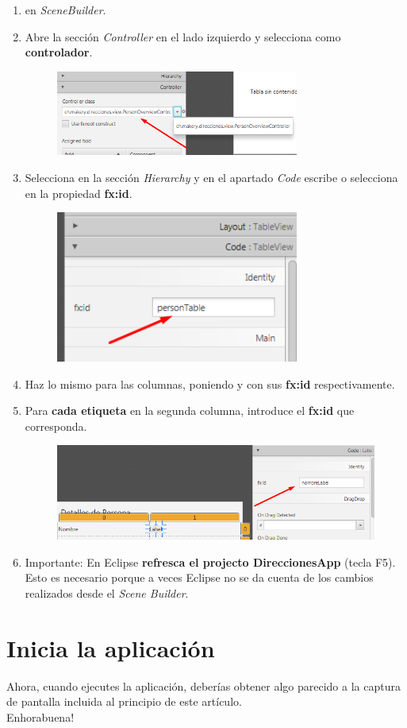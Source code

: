 \begin{enumerate}
	\item {} en \textit{SceneBuilder}.
	\item Abre la sección \textit{Controller} en el lado izquierdo y selecciona  como \textbf{controlador}.
	\begin{figure}[H]
		\includegraphics[width=8cm]{img/selectController}
	\end{figure}
	\item Selecciona  en la sección \textit{Hierarchy} y en el apartado \textit{Code} escribe o selecciona  en la propiedad \textbf{fx:id}.
	\begin{figure}[H]
		\includegraphics[width=8cm]{img/personTable}
	\end{figure}
	\item Haz lo mismo para las columnas, poniendo  y  con sus \textbf{fx:id} respectivamente.
	\item Para \textbf{cada etiqueta} en la segunda columna, introduce el \textbf{fx:id} que corresponda.
	\begin{figure}[H]
		\includegraphics[width=12cm]{img/nombreLabel}
	\end{figure}
	\item Importante: En Eclipse \textbf{refresca el projecto DireccionesApp} (tecla F5). Esto es necesario porque a veces Eclipse no se da cuenta de los cambios realizados desde el \textit{Scene Builder}.
\end{enumerate}

\section{Inicia la aplicación}
Ahora, cuando ejecutes la aplicación, deberías obtener algo parecido a la captura de pantalla incluida al principio de este artículo.\\

Enhorabuena!

